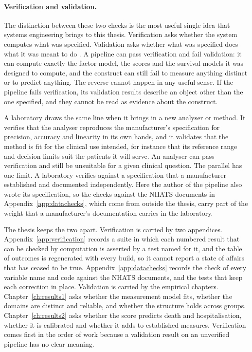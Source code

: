 \paragraph{Verification and validation.} The distinction between these two
checks is the most useful single idea that systems engineering brings to this
thesis. Verification asks whether the system computes what was specified.
Validation asks whether what was specified does what it was meant to do
\citep{incose_2015}. A pipeline can pass verification and fail validation: it
can compute exactly the factor model, the scores and the survival models it
was designed to compute, and the construct can still fail to measure anything
distinct or to predict anything. The reverse cannot happen in any useful sense.
If the pipeline fails verification, its validation results describe an object
other than the one specified, and they cannot be read as evidence about the
construct.

A laboratory draws the same line when it brings in a new analyser or method.
It verifies that the analyser reproduces the manufacturer's specification for
precision, accuracy and linearity in its own hands, and it validates that the
method is fit for the clinical use intended, for instance that its reference
range and decision limits suit the patients it will serve. An analyser can
pass verification and still be unsuitable for a given clinical question. The
parallel has one limit. A laboratory verifies against a specification that a
manufacturer established and documented independently. Here the author of the
pipeline also wrote its specification, so the checks against the NHATS
documents in Appendix~\ref{app:datachecks}, which come from outside the
thesis, carry part of the weight that a manufacturer's documentation carries
in the laboratory.

The thesis keeps the two apart. Verification is carried by two appendices.
Appendix~\ref{app:verification} records a suite in which each numbered result
that can be checked by computation is asserted by a test named for it, and the
table of outcomes is regenerated with every build, so it cannot report a state
of affairs that has ceased to be true. Appendix~\ref{app:datachecks} records
the check of every variable name and code against the NHATS documents, and the
tests that keep each correction in place. Validation is carried by the
empirical chapters. Chapter~\ref{ch:results1} asks whether the measurement
model fits, whether the domains are distinct and reliable, and whether the
structure holds across groups. Chapter~\ref{ch:results2} asks whether the
score predicts death and hospitalisation, whether it is calibrated and whether
it adds to established measures. Verification comes first in the order of
work because a validation result on an unverified pipeline has no clear
meaning.

